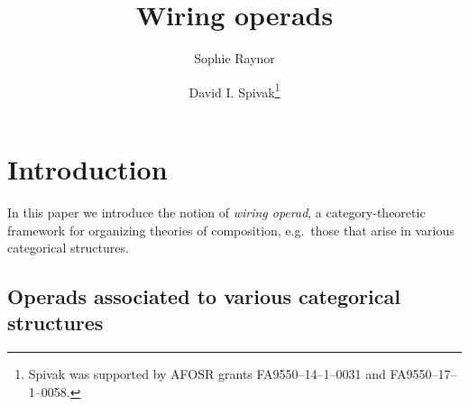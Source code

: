\documentclass[11pt, article, oneside]{memoir}
\theoremstyle{plain}
\theoremstyle{definition}
\theoremstyle{remark}
\begin{document}
\title{Wiring operads}

\author{
  Sophie Raynor
  \and 
  David I. Spivak\thanks{Spivak was supported by AFOSR grants 
FA9550--14--1--0031 and FA9550--17--1--0058.}
}
\date{}

\maketitle

\chapter{Introduction}

In this paper we introduce the notion of \emph{wiring operad}, a category-theoretic framework for organizing theories of composition, e.g.\ those that arise in various categorical structures.

\section{Operads associated to various categorical structures}
\end{document}
